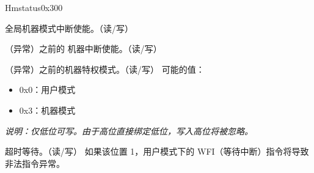 \begin{register}{H}{mstatus}{0x300}\label{regdesc:MSTATUS}
%
%
%
%
%
%
%
%
%
\regnewline%
\begin{regdesc}\begin{reglist}
\label{fielddesc:MSTATUSMIE}\item [MIE] 全局机器模式中断使能。（读/写）
\label{fielddesc:MSTATUSMPIE}\item [MPIE] （异常）之前的 机器中断使能。（读/写）
\label{fielddesc:MSTATUSMPP}\item [MPP] （异常）之前的机器特权模式。（读/写）
\newline 可能的值：
\begin{itemize}
    \setlength\itemsep{-1em}
    \item 0x0：用户模式
    \item 0x3：机器模式
\end{itemize}
\textit{说明：仅低位可写。由于高位直接绑定低位，写入高位将被忽略。}
\label{fielddesc:MSTATUSTW}\item [TW] 超时等待。（读/写）
\newline 如果该位置 1，用户模式下的 WFI（等待中断）指令将导致非法指令异常。
\end{reglist}\end{regdesc}
\end{register}

